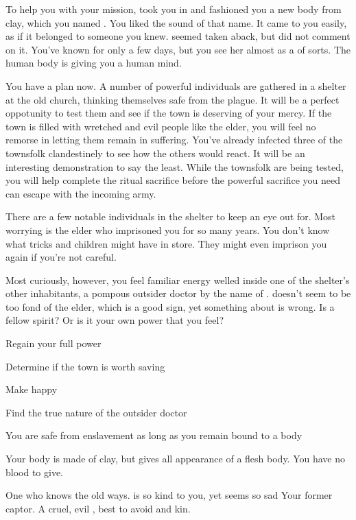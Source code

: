 \documentclass[char]{Pestilence}
\begin{document}
To help you with your mission, \cShaman{} took you in and fashioned you a new body from clay, which you named \cPlaguebearer{}. You liked the sound of that name. It came to you easily, as if it belonged to someone you knew.  \cShaman{} seemed taken aback, but \cShaman{\they} did not comment on it. You've known \cShaman{\them} for only a few days, but you see her almost as a \cShaman{\parent} of sorts. The human body is giving you a human mind.

You have a plan now. A number of powerful individuals are gathered in a shelter at the old church, thinking themselves safe from the plague. It will be a perfect oppotunity to test them and see if the town is deserving of your mercy. If the town is filled with wretched and evil people like the elder, you will feel no remorse in letting them remain in suffering. You've already infected three of the townsfolk clandestinely to see how the others would react. It will be an interesting demonstration to say the least. While the townsfolk are being tested, you will help \cShaman{} complete the ritual sacrifice before the powerful sacrifice you need can escape with the incoming army.

There are a few notable individuals in the shelter to keep an eye out for. Most worrying is the elder who imprisoned you for so many years. You don't know what tricks \cElder{\they} and \cElder{\their} children might have in store. They might even imprison you again if you're not careful. 

Most curiously, however, you feel familiar energy welled inside one of the shelter's other inhabitants, a pompous outsider doctor by the name of \cOutsider{}. \cOutsider{\They} doesn't seem to be too fond of the elder, which is a good sign, yet something about \cOutsider{\them} is wrong. Is \cOutsider{\they} a fellow spirit? Or is it your own power that you feel?

\begin{itemz}[Goals]
	\item Regain your full power
	\item Determine if the town is worth saving
	\item Make \cShaman{} happy
	\item Find the true nature of the outsider doctor
\end{itemz}

\begin{itemz}[Notes]
	\item You are safe from enslavement as long as you remain bound to a body
	\item Your body is made of clay, but gives all appearance of a flesh body. You have no blood to give.
\end{itemz}

\begin{contacts}
	\contact{\cShaman{}} One who knows the old ways. \cShaman{\They} is so kind to you, yet \cShaman{\they} seems so sad
	\contact{\cElder{}} Your former captor. A cruel, evil \cElder{\human}, best to avoid \cElder{\them} and \cElder{\their} kin.
\end{contacts}
\end{document}

